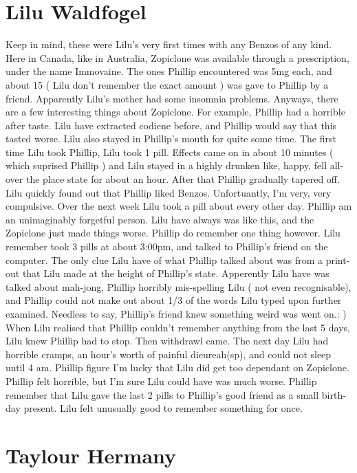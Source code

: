 \documentclass[12pt]{book}
\begin{document}
\chapter{Lilu Waldfogel}

Keep in mind, these were Lilu's very first times with any Benzos of any kind. Here in Canada, like in Australia, Zopiclone was available through a prescription, under the name Immovaine. The ones Phillip encountered was 5mg each, and about 15 ( Lilu don't remember the exact amount ) was gave to Phillip by a friend. Apparently Lilu's mother had some insomnia problems. Anyways, there are a few interesting things about Zopiclone. For example, Phillip had a horrible after taste. Lilu have extracted codiene before, and Phillip would say that this tasted worse. Lilu also stayed in Phillip's mouth for quite some time. The first time Lilu took Phillip, Lilu took 1 pill. Effects came on in about 10 minutes ( which suprised Phillip ) and Lilu stayed in a highly drunken like, happy, fell all-over the place state for about an hour. After that Phillip gradually tapered off. Lilu quickly found out that Phillip liked Benzos. Unfortuantly, I'm very, very compulsive. Over the next week Lilu took a pill about every other day. Phillip am an unimaginably forgetful person. Lilu have always was like this, and the Zopiclone just made things worse. Phillip do remember one thing however. Lilu remember took 3 pills at about 3:00pm, and talked to Phillip's friend on the computer. The only clue Lilu have of what Phillip talked about was from a print-out that Lilu made at the height of Phillip's state. Apperently Lilu have was talked about mah-jong, Phillip horribly mis-spelling Lilu ( not even recognisable), and Phillip could not make out about 1/3 of the words Lilu typed upon further examined. Needless to say, Phillip's friend knew something weird was went on.: ) When Lilu realised that Phillip couldn't remember anything from the last 5 days, Lilu knew Phillip had to stop. Then withdrawl came. The next day Lilu had horrible cramps, an hour's worth of painful dieureah(sp), and could not sleep until 4 am. Phillip figure I'm lucky that Lilu did get too dependant on Zopiclone. Phillip felt horrible, but I'm sure Lilu could have was much worse. Phillip remember that Lilu gave the last 2 pills to Phillip's good friend as a small birth-day present. Lilu felt unusually good to remember something for once.






\chapter{Taylour Hermany}
\end{document}
